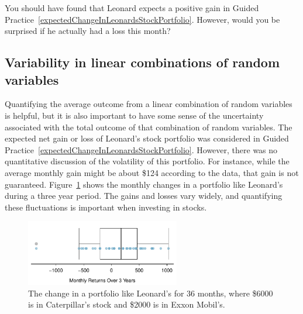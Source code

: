 \begin{exercisewrap}
\begin{nexercise}
You should have found that Leonard expects a positive gain
in Guided Practice~\ref{expectedChangeInLeonardsStockPortfolio}.
However, would you be surprised if he actually had
a loss this month?\footnotemark
\end{nexercise}
\end{exercisewrap}


\subsection{Variability in linear combinations of random variables}
\label{var_lin_combo_of_RVs}

Quantifying the average outcome from a linear combination
of random variables is helpful, but it is also important
to have some sense of the uncertainty associated with
the total outcome of that combination of random variables.
The expected net gain or loss of Leonard's stock portfolio
was considered in Guided Practice~\ref{expectedChangeInLeonardsStockPortfolio}.
However, there was no quantitative discussion of the
volatility of this portfolio.
For instance, while the average monthly gain might be
about \$124 according to the data, that gain is not guaranteed.
Figure~\ref{changeInLeonardsStockPortfolioFor36Months}
shows the monthly changes in a portfolio like Leonard's during
a three year period.
The gains and losses vary widely, and quantifying these
fluctuations is important when investing in stocks.

\begin{figure}[ht]
\centering
\includegraphics[width=0.6\textwidth]{ch_probability/figures/changeInLeonardsStockPortfolioFor36Months/changeInLeonardsStockPortfolioFor36Months}
\caption{The change in a portfolio like Leonard's for 36 months,
    where \$6000 is in Caterpillar's stock and \$2000 is in
    Exxon Mobil's.}
\label{changeInLeonardsStockPortfolioFor36Months}
\end{figure}


